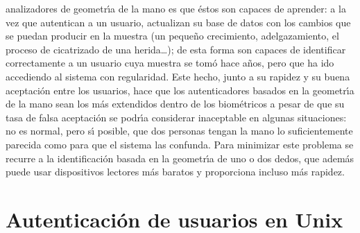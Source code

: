 analizadores de geometr\'{\i}a de la mano es que \'estos son capaces de 
aprender: a la vez que autentican a un usuario, actualizan su base de datos con
los cambios que se puedan producir en la muestra (un peque\~no crecimiento, 
adelgazamiento, el proceso de cicatrizado de una herida\ldots); de esta forma
son capaces de identificar correctamente a un usuario cuya muestra se tom\'o 
hace a\~nos, pero que ha ido accediendo al sistema con regularidad. Este hecho, 
junto a su rapidez y su buena aceptaci\'on entre los usuarios, hace que los 
autenticadores basados en la geometr\'{\i}a de la mano sean los m\'as 
extendidos dentro de los biom\'etricos a pesar de que su tasa de falsa
aceptaci\'on se podr\'{\i}a considerar inaceptable en algunas situaciones: no
es normal, pero s\'{\i} posible, que dos personas tengan la mano lo 
suficientemente parecida como para que el sistema las confunda. Para minimizar
este problema se recurre a la identificaci\'on basada en la geometr\'{\i}a de
uno o dos dedos, que adem\'as puede usar dispositivos lectores m\'as baratos y
proporciona incluso m\'as rapidez.
\section{Autenticaci\'on de usuarios en Unix}
\label{unixua}
